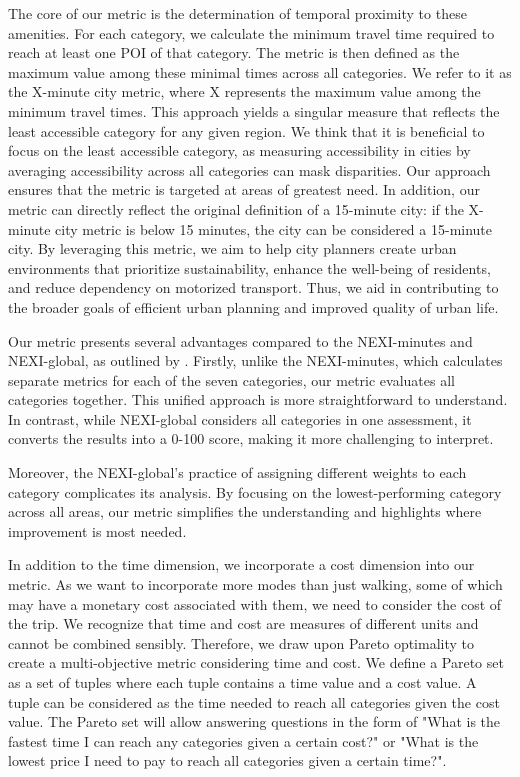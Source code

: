 The core of our metric is the determination of temporal proximity to these amenities. 
For each category, we calculate the minimum travel time required to reach at least one POI of that category. 
The metric is then defined as the maximum value among these minimal times across all categories.
We refer to it as the X-minute city metric, where X represents the maximum value among the minimum travel times.
This approach yields a singular measure that reflects the least accessible category for any given region.
We think that it is beneficial to focus on the least accessible category, as measuring accessibility in cities by averaging accessibility across all categories can mask disparities. 
Our approach ensures that the metric is targeted at areas of greatest need. 
In addition, our metric can directly reflect the original definition of a 15-minute city: if the X-minute city metric is below 15 minutes, the city can be considered a 15-minute city.
By leveraging this metric, we aim to help city planners create urban environments that prioritize sustainability, enhance the well-being of residents, and reduce dependency on motorized transport.
Thus, we aid in contributing to the broader goals of efficient urban planning and improved quality of urban life.

Our metric presents several advantages compared to the NEXI-minutes and NEXI-global, as outlined by .
Firstly, unlike the NEXI-minutes, which calculates separate metrics for each of the seven categories, our metric evaluates all categories together. 
This unified approach is more straightforward to understand. 
In contrast, while NEXI-global considers all categories in one assessment, it converts the results into a 0-100 score, making it more challenging to interpret.

Moreover, the NEXI-global's practice of assigning different weights to each category complicates its analysis. 
By focusing on the lowest-performing category across all areas, our metric simplifies the understanding and highlights where improvement is most needed. 

In addition to the time dimension, we incorporate a cost dimension into our metric.
As we want to incorporate more modes than just walking, some of which may have a monetary cost associated with them, we need to consider the cost of the trip.
We recognize that time and cost are measures of different units and cannot be combined sensibly.
Therefore, we draw upon Pareto optimality to create a multi-objective metric considering time and cost.
We define a Pareto set as a set of tuples where each tuple contains a time value and a cost value.
A tuple can be considered as the time needed to reach all categories given the cost value.
The Pareto set will allow answering questions in the form of "What is the fastest time I can reach any categories given a certain cost?" or "What is the lowest price I need to pay to reach all categories given a certain time?".



